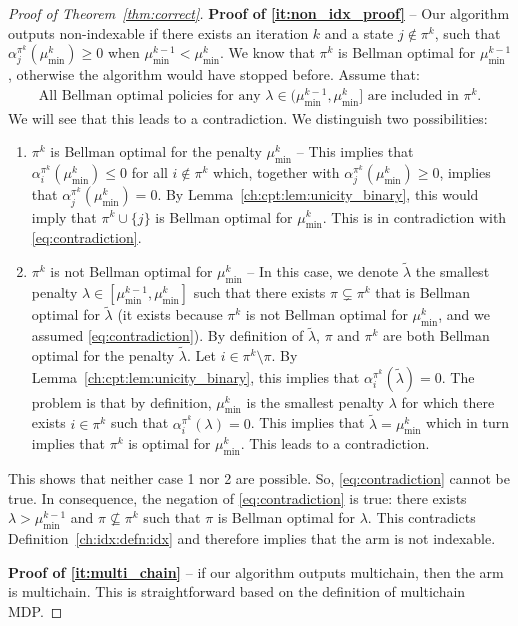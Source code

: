 \begin{proof}[Proof of Theorem~\ref{thm:correct}]
    \textbf{Proof of \ref{it:non_idx_proof}} -- 
    Our algorithm outputs non-indexable if there exists an iteration $k$ and a state $j\notin\pi^k$, such that $\alpha^{\pi^k}_j(\mu^k_{\min})\ge0$ when $\mu^{k-1}_{\min}<\mu^k_{\min}$.
    We know that $\pi^k$ is Bellman optimal for $\mu^{k-1}_{\min}$, otherwise the algorithm would have stopped before.
    Assume that:
    \begin{align}
        \label{eq:contradiction}
        \text{All Bellman optimal policies for any $\lambda\in(\mu^{k-1}_{\min},\mu^k_{\min}]$ are included in $\pi^k$.}
    \end{align}
    We will see that this leads to a contradiction. We distinguish two possibilities: 
    \begin{enumerate}
        \item $\pi^k$ is Bellman optimal for the penalty $\mu^k_{\min}$ -- This implies that $\alpha^{\pi^k}_i(\mu^k_{\min})\le0$ for all $i\not\in\pi^k$ which, together with $\alpha^{\pi^k}_j(\mu^k_{\min})\ge0$, implies that $\alpha^{\pi^k}_j(\mu^k_{\min})=0$.
            By Lemma~\ref{ch:cpt:lem:unicity_binary}, this would imply that $\pi^k\cup\{j\}$ is Bellman optimal for $\mu^k_{\min}$.
            This is in contradiction with \eqref{eq:contradiction}.
        \item $\pi^k$ is not Bellman optimal for $\mu^k_{\min}$ -- In this case, we denote $\tilde{\lambda}$ the smallest penalty $\lambda\in[\mu^{k-1}_{\min},\mu^{k}_{\min}]$ such that there exists $\pi\subsetneq\pi^k$ that is Bellman optimal for $\tilde{\lambda}$ (it exists because $\pi^k$ is not Bellman optimal for $\mu^k_{\min}$, and we assumed \eqref{eq:contradiction}).
            By definition of $\tilde{\lambda}$, $\pi$ and $\pi^k$ are both Bellman optimal for the penalty $\tilde{\lambda}$.
            Let $i\in\pi^k\setminus\pi$.
            By Lemma~\ref{ch:cpt:lem:unicity_binary}, this implies that $\alpha^{\pi^k}_i(\tilde{\lambda})=0$.
            The problem is that by definition, $\mu^k_{\min}$ is the smallest penalty $\lambda$ for which there exists $i\in\pi^k$ such that $\alpha^{\pi^k}_i(\lambda)=0$.
            This implies that $\tilde{\lambda}=\mu^k_{\min}$ which in turn implies that $\pi^k$ is optimal for $\mu^k_{\min}$.
            This leads to a contradiction.
    \end{enumerate}
    This shows that neither case 1 nor 2 are possible. So, \eqref{eq:contradiction} cannot be true.
    In consequence, the negation of \eqref{eq:contradiction} is true: there exists $\lambda>\mu^{k-1}_{\min}$ and $\pi\not\subseteq \pi^k$ such that $\pi$ is Bellman optimal for $\lambda$.
    This contradicts Definition~\ref{ch:idx:defn:idx} and therefore implies that the arm is not indexable. 

    \medskip
    \textbf{Proof of \ref{it:multi_chain}} -- if our algorithm outputs multichain, then the arm is multichain.
    This is straightforward based on the definition of multichain MDP.
\end{proof}


